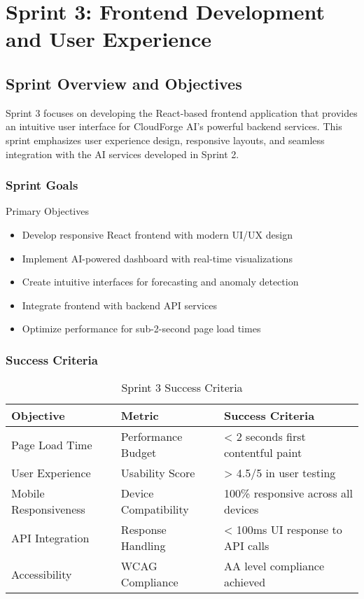 \chapter{Sprint 3: Frontend Development and User Experience}

\section{Sprint Overview and Objectives}

Sprint 3 focuses on developing the React-based frontend application that provides an intuitive user interface for CloudForge AI's powerful backend services. This sprint emphasizes user experience design, responsive layouts, and seamless integration with the AI services developed in Sprint 2.

\subsection{Sprint Goals}

\begin{sprintbox}{Primary Objectives}
\begin{itemize}
    \item Develop responsive React frontend with modern UI/UX design
    \item Implement AI-powered dashboard with real-time visualizations
    \item Create intuitive interfaces for forecasting and anomaly detection
    \item Integrate frontend with backend API services
    \item Optimize performance for sub-2-second page load times
\end{itemize}
\end{sprintbox}

\subsection{Success Criteria}

\begin{table}[H]
\centering
\caption{Sprint 3 Success Criteria}
\begin{tabular}{|p{4cm}|p{3cm}|p{5cm}|}
\hline
\textbf{Objective} & \textbf{Metric} & \textbf{Success Criteria} \\
\hline
Page Load Time & Performance Budget & < 2 seconds first contentful paint \\
\hline
User Experience & Usability Score & > 4.5/5 in user testing \\
\hline
Mobile Responsiveness & Device Compatibility & 100\% responsive across all devices \\
\hline
API Integration & Response Handling & < 100ms UI response to API calls \\
\hline
Accessibility & WCAG Compliance & AA level compliance achieved \\
\hline
\end{tabular}
\end{table}

